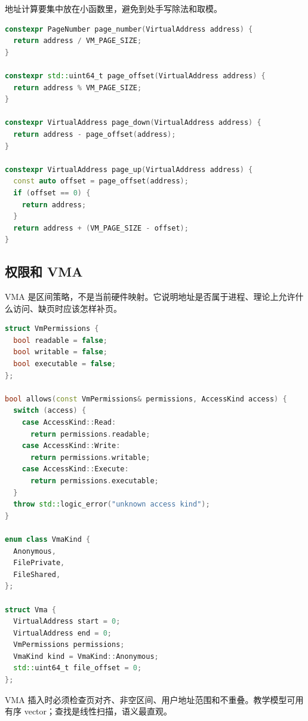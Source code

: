 地址计算要集中放在小函数里，避免到处手写除法和取模。

\begin{lstlisting}[language=C++]
constexpr PageNumber page_number(VirtualAddress address) {
  return address / VM_PAGE_SIZE;
}

constexpr std::uint64_t page_offset(VirtualAddress address) {
  return address % VM_PAGE_SIZE;
}

constexpr VirtualAddress page_down(VirtualAddress address) {
  return address - page_offset(address);
}

constexpr VirtualAddress page_up(VirtualAddress address) {
  const auto offset = page_offset(address);
  if (offset == 0) {
    return address;
  }
  return address + (VM_PAGE_SIZE - offset);
}
\end{lstlisting}

\subsection{权限和 VMA}

VMA 是区间策略，不是当前硬件映射。它说明地址是否属于进程、理论上允许什么访问、缺页时应该怎样补页。

\begin{lstlisting}[language=C++]
struct VmPermissions {
  bool readable = false;
  bool writable = false;
  bool executable = false;
};

bool allows(const VmPermissions& permissions, AccessKind access) {
  switch (access) {
    case AccessKind::Read:
      return permissions.readable;
    case AccessKind::Write:
      return permissions.writable;
    case AccessKind::Execute:
      return permissions.executable;
  }
  throw std::logic_error("unknown access kind");
}

enum class VmaKind {
  Anonymous,
  FilePrivate,
  FileShared,
};

struct Vma {
  VirtualAddress start = 0;
  VirtualAddress end = 0;
  VmPermissions permissions;
  VmaKind kind = VmaKind::Anonymous;
  std::uint64_t file_offset = 0;
};
\end{lstlisting}

VMA 插入时必须检查页对齐、非空区间、用户地址范围和不重叠。教学模型可用有序 vector；查找是线性扫描，语义最直观。

